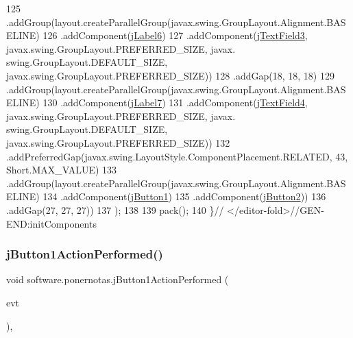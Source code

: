 \begin{DoxyCode}
125                 .addGroup(layout.createParallelGroup(javax.swing.GroupLayout.Alignment.BASELINE)
126                     .addComponent(\mbox{\hyperlink{classsoftware_1_1ponernotas_ac94bb41bd989a69788d89b0522ecba91}{jLabel6}})
127                     .addComponent(\mbox{\hyperlink{classsoftware_1_1ponernotas_a75f364eec0a40fc2d42d6387ea73baaf}{jTextField3}}, javax.swing.GroupLayout.PREFERRED\_SIZE, javax.
      swing.GroupLayout.DEFAULT\_SIZE, javax.swing.GroupLayout.PREFERRED\_SIZE))
128                 .addGap(18, 18, 18)
129                 .addGroup(layout.createParallelGroup(javax.swing.GroupLayout.Alignment.BASELINE)
130                     .addComponent(\mbox{\hyperlink{classsoftware_1_1ponernotas_ae60c32ed6ba0e002b935d38c6d9378a3}{jLabel7}})
131                     .addComponent(\mbox{\hyperlink{classsoftware_1_1ponernotas_a4939c719c7aae97334352b7c4d9fcbf2}{jTextField4}}, javax.swing.GroupLayout.PREFERRED\_SIZE, javax.
      swing.GroupLayout.DEFAULT\_SIZE, javax.swing.GroupLayout.PREFERRED\_SIZE))
132                 .addPreferredGap(javax.swing.LayoutStyle.ComponentPlacement.RELATED, 43, Short.MAX\_VALUE)
133                 .addGroup(layout.createParallelGroup(javax.swing.GroupLayout.Alignment.BASELINE)
134                     .addComponent(\mbox{\hyperlink{classsoftware_1_1ponernotas_ab5d7404242d2345a5e4b00f8816b4834}{jButton1}})
135                     .addComponent(\mbox{\hyperlink{classsoftware_1_1ponernotas_a5c280378d6fe6477170e9ede3ac8ae98}{jButton2}}))
136                 .addGap(27, 27, 27))
137         );
138 
139         pack();
140     \}\textcolor{comment}{// </editor-fold>//GEN-END:initComponents}
\end{DoxyCode}
\mbox{\label{classsoftware_1_1ponernotas_a99036ee7583ce0aca853962f41f7a5d2}} 
\subsubsection{\texorpdfstring{j\+Button1\+Action\+Performed()}{jButton1ActionPerformed()}}
{\footnotesize\ttfamily void software.\+ponernotas.\+j\+Button1\+Action\+Performed (\begin{DoxyParamCaption}\item[{java.\+awt.\+event.\+Action\+Event}]{evt }\end{DoxyParamCaption})\hspace{0.3cm}{\ttfamily [inline]}, {\ttfamily [private]}}


